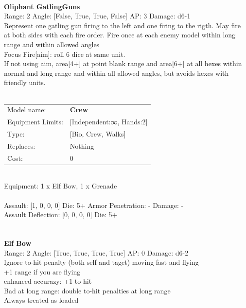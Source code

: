 \ \\
{\bf Oliphant GatlingGuns } \\



Range: 2  Angle: [False, True, True, False] AP: 3 Damage: d6-1 \\
Represent one gatling gun firing to the left and one firing to the rigth. May fire at both sides with each fire order. Fire once at each enemy model within long range and within allowed angles\\ 
Focus Fire[aim]: roll 6 dice at same unit.\\ 
If not using aim, area[4+] at point blank range and area[6+] at all hexes within normal and long range and within all allowed angles, but avoids hexes with friendly units.\\ 




 
\ \\

\noindent
\begin{tabular}{ll}
Model name: &{\bf Crew } \\
Equipment Limits: &[Independent:∞, Hands:2] \\
Type: &[Bio, Crew, Walks] \\
Replaces: &Nothing \\
Cost: & 0\\
\end{tabular}
\ \\
Equipment: 1 x Elf Bow, 1 x Grenade \\
\ \\
Assault: [1, 0, 0, 0] Die: 5+ Armor Penetration: - Damage: - \\
Assault Deflection: [0, 0, 0, 0] Die: 5+\\
\indent  
\ \\

\ \\
{\bf Elf Bow } \\



Range: 2  Angle: [True, True, True, True] AP: 0 Damage: d6-2 \\
Ignore to-hit penalty (both self and taget) moving fast and flying\\ 
+1 range if you are flying\\ 
enhanced accurazy: +1 to hit\\ 
Bad at long range: double to-hit penalties at long range\\ 
Always treated as loaded\\ 




